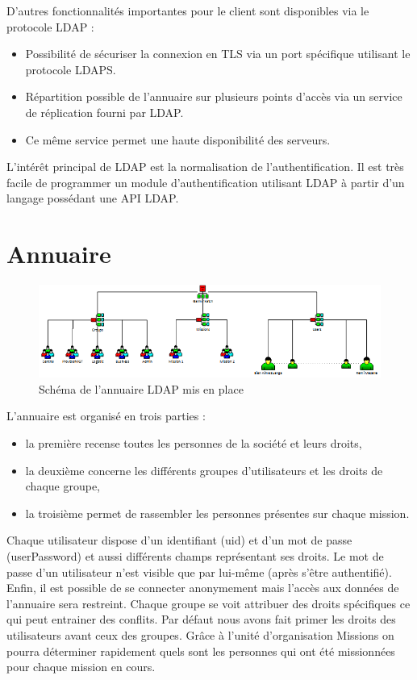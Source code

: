 \documentclass[11pt,fleqn]{report}
\begin{document}
D’autres fonctionnalités importantes pour le client sont disponibles via le protocole LDAP :
\begin{itemize}
\item Possibilité de sécuriser la connexion en TLS via un port spécifique utilisant le protocole LDAPS.
\item Répartition possible de l’annuaire sur plusieurs points d’accès via un service de réplication fourni par LDAP.
\item Ce même service permet une haute disponibilité des serveurs.
\end{itemize}

L'intérêt principal de LDAP est la normalisation de l'authentification. Il est très facile de programmer un module d'authentification utilisant LDAP à partir d'un langage possédant une API LDAP.
\chapter{Annuaire}
\begin{figure}[htbp]
	\centering
	\includegraphics[scale=0.9]{Images/SchemaLDAP.png}
	\caption{Schéma de l'annuaire LDAP mis en place}
	\label{SchemaLDAP}
\end{figure}
L’annuaire est organisé en trois parties :
\begin{itemize}
\item la première recense toutes les personnes de la société et leurs droits,
\item la deuxième concerne les différents groupes d’utilisateurs et les droits de chaque groupe,
\item la troisième permet de rassembler les personnes présentes sur chaque mission.
\end{itemize}
Chaque utilisateur dispose d’un identifiant (uid) et d’un mot de passe (userPassword) et aussi différents champs représentant ses droits. Le mot de passe d’un utilisateur n’est visible que par lui-même (après s’être authentifié). Enfin, il est possible de se connecter anonymement mais l’accès aux données de l’annuaire sera restreint.
Chaque groupe se voit attribuer des droits spécifiques ce qui peut entrainer des conflits. Par défaut nous avons fait primer les droits des utilisateurs avant ceux des groupes.
Grâce à l’unité d’organisation Missions on pourra déterminer rapidement quels sont les personnes qui ont été missionnées pour chaque mission en cours.
\end{document}
